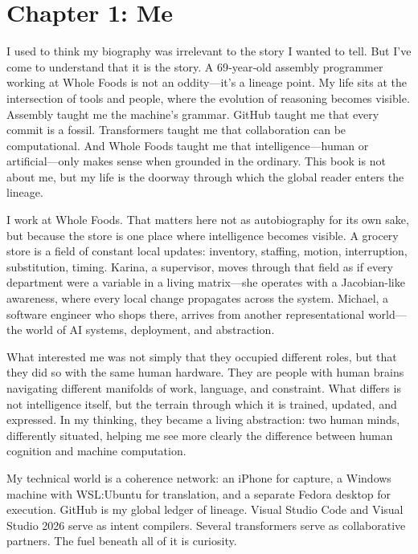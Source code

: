 \newpage
\vspace*{3cm}

\hypertarget{chapter-1-me}{%
\section{Chapter 1: Me}\label{chapter-1-me}}

I used to think my biography was irrelevant to the story I wanted to
tell. But I've come to understand that it is the story. A 69‑year‑old
assembly programmer working at Whole Foods is not an oddity---it's a
lineage point. My life sits at the intersection of tools and people,
where the evolution of reasoning becomes visible. Assembly taught me the
machine's grammar. GitHub taught me that every commit is a fossil.
Transformers taught me that collaboration can be computational. And
Whole Foods taught me that intelligence---human or artificial---only
makes sense when grounded in the ordinary. This book is not about me,
but my life is the doorway through which the global reader enters the
lineage.

I work at Whole Foods. That matters here not as autobiography for its
own sake, but because the store is one place where intelligence becomes
visible. A grocery store is a field of constant local updates:
inventory, staffing, motion, interruption, substitution, timing. Karina,
a supervisor, moves through that field as if every department were a
variable in a living matrix---she operates with a Jacobian-like
awareness, where every local change propagates across the system.
Michael, a software engineer who shops there, arrives from another
representational world---the world of AI systems, deployment, and
abstraction.

What interested me was not simply that they occupied different roles,
but that they did so with the same human hardware. They are people with
human brains navigating different manifolds of work, language, and
constraint. What differs is not intelligence itself, but the terrain
through which it is trained, updated, and expressed. In my thinking,
they became a living abstraction: two human minds, differently situated,
helping me see more clearly the difference between human cognition and
machine computation.

My technical world is a coherence network: an iPhone for capture, a
Windows machine with WSL:Ubuntu for translation, and a separate Fedora
desktop for execution. GitHub is my global ledger of lineage. Visual
Studio Code and Visual Studio 2026 serve as intent compilers. Several
transformers serve as collaborative partners. The fuel beneath all of it
is curiosity.

